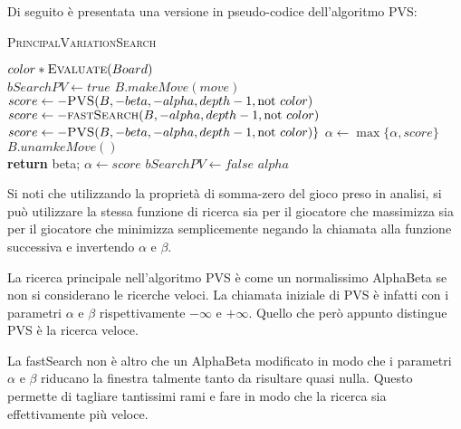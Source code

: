 \documentclass[a4paper]{article}
\begin{document}
Di seguito è presentata una versione in pseudo-codice dell'algoritmo PVS:

\begin{algorithm}[H]
  \caption{\textsc{PrincipalVariationSearch}}
  \label{alg_pvs}
  \begin{algorithmic}[0]

        \State \Return $color * \Call{Evaluate}{Board}$
      \EndIf
      \\
      \State $bSearchPV \gets true$
        \State $B.makeMove(move)$
          \State $score \gets -\Call{PVS}{B, -beta, -alpha, depth - 1, \textrm{not } color}$
        \Else
          \State $score \gets -\Call{fastSearch}{B, -alpha, depth - 1, \textrm{not } color}$
            \State $score \gets -\Call{PVS}{B, -beta, -alpha, depth - 1, \textrm{not } color}\}$
            \State $\alpha \gets \max\{\alpha, score\}$
          \EndIf
        \EndIf
        \State $B.unamkeMove()$
        \\
        \State \textbf{return} beta;
        \EndIf
          \State $\alpha \gets score$
        \EndIf
        \State $bSearchPV \gets false$
      \EndFor
      \State \Return $alpha$
    \EndFunction

  \end{algorithmic}
\end{algorithm}

Si noti che utilizzando la proprietà di somma-zero del gioco preso in analisi, 
si può utilizzare la stessa funzione di ricerca sia per il giocatore che 
massimizza sia per il giocatore che minimizza semplicemente negando la chiamata
alla funzione successiva e invertendo $\alpha$ e $\beta$.

La ricerca principale nell'algoritmo PVS è come un normalissimo AlphaBeta se non
si considerano le ricerche veloci. La chiamata iniziale di PVS è infatti con i
parametri $\alpha$ e $\beta$ rispettivamente $-\infty$ e $+\infty$. Quello che 
però appunto distingue PVS è la ricerca veloce.

La fastSearch non è altro che un AlphaBeta modificato in modo che i parametri 
$\alpha$ e $\beta$ riducano la finestra talmente tanto da risultare quasi nulla.
Questo permette di tagliare tantissimi rami e fare in modo che la ricerca sia
effettivamente più veloce.
\end{document}
